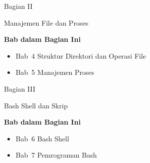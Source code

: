 \documentclass[
    paper=23cm:15.5cm,   %
    11pt,               %
    twoside,            %
    openany,            %
    bibliography=totoc, %
]{scrbook}            %
\begin{document}


\newpage
{}
\vspace*{4cm}
{\fontsize{28}{34}\sffamily\bfseries\raggedright Bagian II\par}
\vspace{6pt}
{\fontsize{22}{28}\sffamily\bfseries\raggedright Manajemen File dan Proses\par}
\vspace{16pt}
{\large\sffamily\bfseries Bab dalam Bagian Ini}\par
\vspace{6pt}
\begin{itemize}[topsep=0pt, itemsep=2pt]
  \item Bab~4 \textbullet{} Struktur Direktori dan Operasi File
  \item Bab~5 \textbullet{} Manajemen Proses
\end{itemize}
\newpage





\newpage
{}
\vspace*{4cm}
{\fontsize{28}{34}\sffamily\bfseries\raggedright Bagian III\par}
\vspace{6pt}
{\fontsize{22}{28}\sffamily\bfseries\raggedright Bash Shell dan Skrip\par}
\vspace{16pt}
{\large\sffamily\bfseries Bab dalam Bagian Ini}\par
\vspace{6pt}
\begin{itemize}[topsep=0pt, itemsep=2pt]
  \item Bab~6 \textbullet{} Bash Shell
  \item Bab~7 \textbullet{} Pemrograman Bash
\end{itemize}
\newpage




\end{document}
